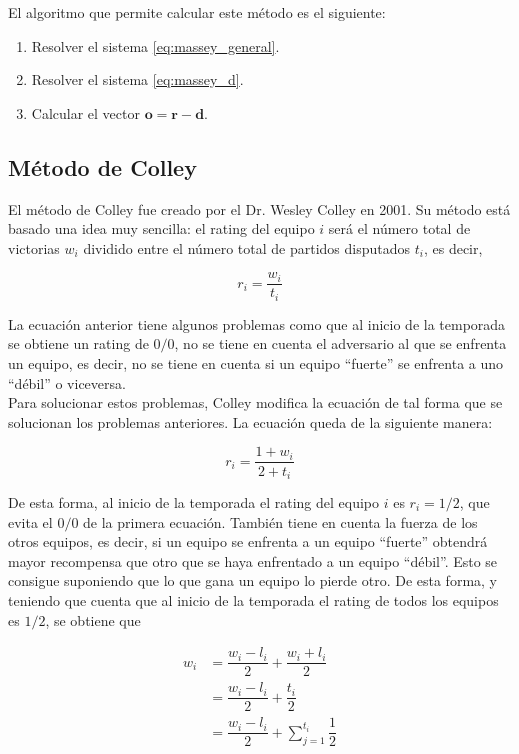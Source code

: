 El algoritmo que permite calcular este método es el siguiente:

\begin{enumerate}
\item Resolver el sistema \ref{eq:massey_general}.
\item Resolver el sistema \ref{eq:massey_d}.
\item Calcular el vector $\mathbf{o} = \mathbf{r} - \mathbf{d}$.
\end{enumerate}

\subsection{Método de Colley}

El método de Colley fue creado por el Dr. Wesley Colley en 2001. Su método está basado una idea muy sencilla: el rating del equipo $i$ será el número total de victorias $w_i$ dividido entre el número total de partidos disputados $t_i$, es decir, 

\begin{equation}
r_i = \dfrac{w_i}{t_i}
\end{equation}

La ecuación anterior tiene algunos problemas como que al inicio de la temporada se obtiene un rating de $0/0$, no se tiene en cuenta el adversario al que se enfrenta un equipo, es decir, no se tiene en cuenta si un equipo ``fuerte'' se enfrenta a uno ``débil'' o viceversa. \\
Para solucionar estos problemas, Colley modifica la ecuación de tal forma que se solucionan los problemas anteriores. La ecuación queda de la siguiente manera:

\begin{equation}
r_i = \dfrac{1 + w_i}{2 + t_i} \label{eq:colley}
\end{equation}

De esta forma, al inicio de la temporada el rating del equipo $i$ es $r_i = 1/2$, que evita el $0/0$ de la primera ecuación. También tiene en cuenta la fuerza de los otros equipos, es decir, si un equipo se enfrenta a un equipo ``fuerte'' obtendrá mayor recompensa que otro que se haya enfrentado a un equipo ``débil''. Esto se consigue suponiendo que lo que gana un equipo lo pierde otro. De esta forma, y teniendo que cuenta que al inicio de la temporada el rating de todos los equipos es $1/2$, se obtiene que

\begin{align}
w_i & = \dfrac{w_i - l_i}{2} + \dfrac{w_i + l_i}{2} \\
&= \dfrac{w_i - l_i}{2} + \dfrac{t_i}{2} \\
&= \dfrac{w_i - l_i}{2} + \sum_{j=1}^{t_i} \dfrac{1}{2}
\end{align}  

